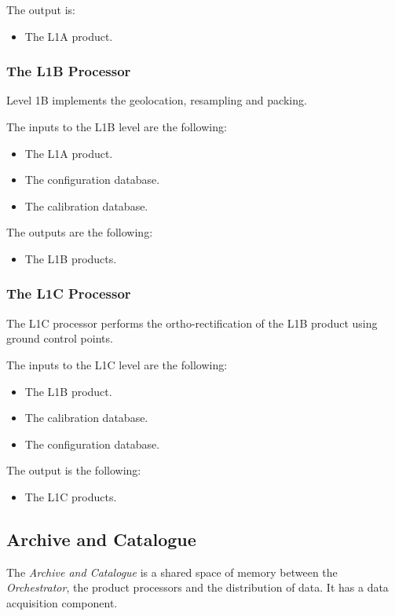 The output is:
\begin{itemize}
\item The L1A product.
\end{itemize}

\subsubsection{The L1B Processor}
Level 1B implements the geolocation, resampling and packing.

The inputs to the L1B level are the following:
\begin{itemize}
\item The L1A product.
\item The configuration database.
\item The calibration database.
\end{itemize}

The outputs are the following:
\begin{itemize}
\item The L1B products.
\end{itemize}


\subsubsection{The L1C Processor}

The L1C processor performs the ortho-rectification of the L1B product using ground control points.

The inputs to the L1C level are the following:
\begin{itemize}
\item The L1B  product.
\item The calibration database.
\item The configuration database.
\end{itemize}

The output is the following:
\begin{itemize}
\item The L1C products.
\end{itemize}


\subsection{Archive and Catalogue}



The \emph{Archive and Catalogue} is a shared space of memory between the \emph{Orchestrator}, the product processors and the distribution of data. It has a data acquisition component.

